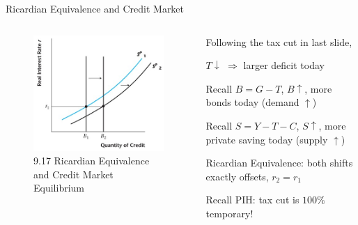 \documentclass[11pt,aspectratio=169,usenames,dvipsnames]{beamer}
\let\tempone\itemize
\let\temptwo\enditemize
\renewenvironment{itemize}{\tempone\addtolength{\itemsep}{\fill}}{\temptwo}
\begin{document}
\begin{frame}{Ricardian Equivalence and Credit Market}
\label{slide:Ricardian_Equivalence_and_Credit_Market}
    \begin{columns}
        \begin{column}{0.5\textwidth}
            \begin{figure}
                \caption{\scriptsize 9.17  Ricardian Equivalence and Credit Market Equilibrium}
                \includegraphics[width=.9\textwidth]{./figures/Figure9_17.jpg}
            \end{figure}
        \end{column}
        \begin{column}{0.5\textwidth}
            Following the tax cut in last slide,
            \begin{itemize}
                \item $ T \downarrow  $ $ \Rightarrow  $ larger deficit today
                \item Recall $ B = G - T $, $ B \uparrow  $, more bonds today (demand $ \uparrow  $)
                \item Recall $ S = Y - T - C $, $ S \uparrow  $, more private saving today (supply $ \uparrow  $)
                \item Ricardian Equivalence: both shifts \alert{exactly} offsets, $ r_{2} = r_{1} $
                \item Recall PIH: tax cut is $ 100\% $ temporary!
            \end{itemize}
        \end{column}
    \end{columns}
\end{frame}
\end{document}

